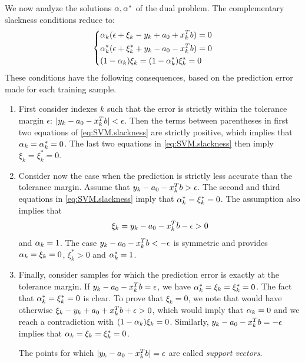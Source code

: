 We now analyze the solutions   $\alpha, \alpha^*$ of the dual problem. The complementary slackness conditions reduce to:
\begin{equation}
\label{eq:SVM.slackness}
\left\{\begin{aligned}
&\alpha_k (\epsilon + \xi_k - y_k + {a_0} + x_k^T b) = 0  \\
&\alpha_k^* (\epsilon + \xi_k^* + y_k - {a_0} - x_k^T b) = 0  \\
&(1-\alpha_k)\xi_k = (1-\alpha_k^*)\xi_k^* = 0
\end{aligned}
\right.
\end{equation}
These conditions have the following consequences,  based on the prediction error made for each training sample.
\begin{enumerate}[label=(\roman*), wide=0.5cm]
\item First consider indexes $k$
such that the error is strictly within the tolerance
margin $\epsilon$: $|y_k - {a_0} - x_k^Tb| < \epsilon$. Then the terms between parentheses in first two equations of \eqref{eq:SVM.slackness} are strictly positive, which implies that $\alpha_k = \alpha_k^* = 0$. The last two equations in \eqref{eq:SVM.slackness} then imply $\xi_k  = \xi_k^* = 0$. 
\item Consider now the case when the prediction is strictly less accurate
than the tolerance margin. Assume that $y_k - {a_0} - x_k^Tb > \epsilon$. The second and third equations in \eqref{eq:SVM.slackness} imply that $\alpha_k^* = \xi_k^* = 0$. The assumption also implies that 
\[
\xi_k = y_k - {a_0} - x_k^Tb -\epsilon >0
\]
and $\alpha_k = 1$. The case $y_k - {a_0} - x_k^Tb < - \epsilon$ is symmetric and provides $\alpha_k = \xi_k = 0$, $\xi_k^*  >0$
and $\alpha_k^* = 1$.

\item Finally, consider samples for which the prediction error is exactly
at the tolerance margin. If $y_k - {a_0} - x_k^T b = \epsilon$, we have $\alpha_k^* = \xi_k = \xi_k^* =0$. The fact that $\alpha_k^* = \xi_k^*=0$ is clear. To prove that $\xi_k=0$, we note that would have otherwise  $\xi_k - y_k + {a_0} + x_k^Tb +\epsilon > 0$, which would imply that $\alpha_k=0$ and we  reach a contradiction with $(1-\alpha_k)\xi_k=0$. Similarly, $y_k - {a_0} - x_k^T b = -\epsilon$ implies that $\alpha_k = \xi_k = \xi_k^* =0$.

The points for which $|y_k - {a_0} - x_k^T b| = \epsilon$ are called {\em support vectors}.
\end{enumerate}

